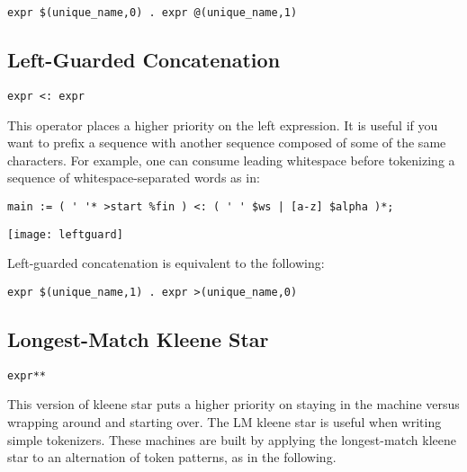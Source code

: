 \documentclass[letterpaper,11pt,oneside]{book}
\newcommand{\verbspace}{\vspace{10pt}}
\newcommand{\graphspace}{\vspace{10pt}}
\newenvironment{inline_code}{\def\baselinestretch{1}\vspace{12pt}\small}{}
\begin{document}
\verbspace
\begin{verbatim}
expr $(unique_name,0) . expr @(unique_name,1)
\end{verbatim}

\subsection{Left-Guarded Concatenation}

\verb|expr <: expr| 
\verbspace

This operator places
a higher priority on the left expression. It is useful if you want to prefix a
sequence with another sequence composed of some of the same characters. For
example, one can consume leading whitespace before tokenizing a sequence of
whitespace-separated words as in:

\begin{inline_code}
\begin{verbatim}
main := ( ' '* >start %fin ) <: ( ' ' $ws | [a-z] $alpha )*;
\end{verbatim}
\end{inline_code}

\graphspace
\begin{center}
\texttt{[image: leftguard]}
\end{center}
\graphspace

Left-guarded concatenation is equivalent to the following:

\verbspace
\begin{verbatim}
expr $(unique_name,1) . expr >(unique_name,0)
\end{verbatim}
\verbspace

\subsection{Longest-Match Kleene Star}
\label{longest_match_kleene_star}

\verb|expr**| 
\verbspace

This version of kleene star puts a higher priority on staying in the
machine versus wrapping around and starting over. The LM kleene star is useful
when writing simple tokenizers.  These machines are built by applying the
longest-match kleene star to an alternation of token patterns, as in the
following.

\verbspace
\end{document}
